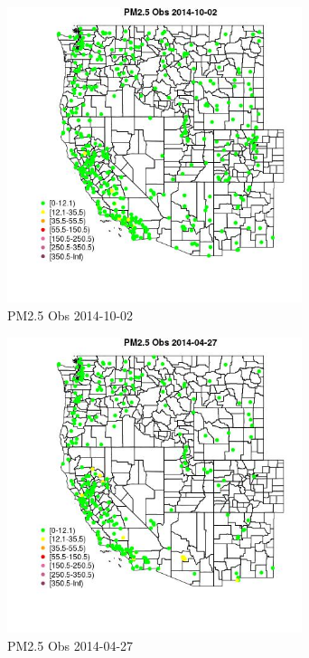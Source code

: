\begin{figure} 
\centering  
\includegraphics[width=0.77\textwidth]{Code_Outputs/Report_ML_input_PM25_Step4_part_e_de_duplicated_aveswNAs_MapObsPM25_Obs2014-10-02.jpg} 
\caption{\label{fig:Report_ML_input_PM25_Step4_part_e_de_duplicated_aveswNAsMapObsPM25_Obs2014-10-02}PM2.5 Obs 2014-10-02} 
\end{figure} 
 

\begin{figure} 
\centering  
\includegraphics[width=0.77\textwidth]{Code_Outputs/Report_ML_input_PM25_Step4_part_e_de_duplicated_aveswNAs_MapObsPM25_Obs2014-04-27.jpg} 
\caption{\label{fig:Report_ML_input_PM25_Step4_part_e_de_duplicated_aveswNAsMapObsPM25_Obs2014-04-27}PM2.5 Obs 2014-04-27} 
\end{figure} 
 

